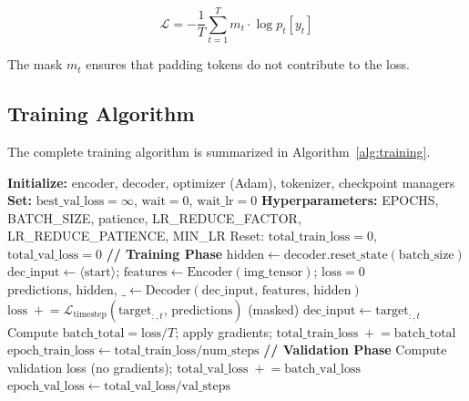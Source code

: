 \begin{equation}
    \mathcal{L} = - \frac{1}{T} \sum_{t=1}^T m_t \cdot \log p_t[y_t]
\end{equation}

The mask $m_t$ ensures that padding tokens do not contribute to the loss.

\subsection{Training Algorithm}
The complete training algorithm is summarized in Algorithm~\ref{alg:training}.

\begin{algorithm}[htbp]
\caption{Image Captioning Model Training}
\label{alg:training}
\begin{algorithmic}[1]
    \State \textbf{Initialize:} encoder, decoder, optimizer (Adam), tokenizer, checkpoint managers
    \State \textbf{Set:} $\text{best\_val\_loss}=\infty$, $\text{wait}=0$, $\text{wait\_lr}=0$
    \State \textbf{Hyperparameters:} EPOCHS, BATCH\_SIZE, patience, LR\_REDUCE\_FACTOR, LR\_REDUCE\_PATIENCE, MIN\_LR
        \State Reset: $\text{total\_train\_loss}=0$, $\text{total\_val\_loss}=0$
        \State \textbf{// Training Phase}
            \State $\text{hidden} \gets \text{decoder.reset\_state}(\text{batch\_size})$
            \State $\text{dec\_input} \gets \langle\text{start}\rangle$; $\text{features} \gets \text{Encoder}(\text{img\_tensor})$; $\text{loss}=0$
                \State $\text{predictions},\,\text{hidden},\,\_ \gets \text{Decoder}(\text{dec\_input},\,\text{features},\,\text{hidden})$
                \State $\text{loss} \;+\!\!= \mathcal{L}_{\text{timestep}}(\text{target}_{:,t},\,\text{predictions})$ (masked)
                \State $\text{dec\_input} \gets \text{target}_{:,t}$ 
            \EndFor
            \State Compute $\text{batch\_total} = \text{loss} / T$; apply gradients; $\text{total\_train\_loss} \;+\!\!= \text{batch\_total}$
        \EndFor
        \State $\text{epoch\_train\_loss} \gets \text{total\_train\_loss} / \text{num\_steps}$
        \State \textbf{// Validation Phase}
            \State Compute validation loss (no gradients); $\text{total\_val\_loss} \;+\!\!= \text{batch\_val\_loss}$
        \EndFor
        \State $\text{epoch\_val\_loss} \gets \text{total\_val\_loss} / \text{val\_steps}$

\end{algorithmic}
\end{algorithm}
